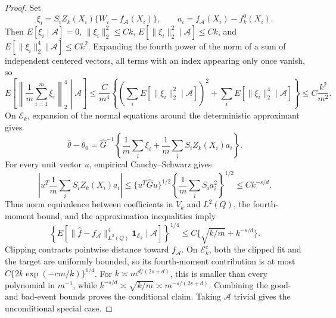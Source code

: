 \documentclass{article}
\begin{document}
\begin{proof}
Set
\[
\xi_i=S_iZ_k(X_i)\{W_i-f_{\mathcal A}(X_i)\},\qquad
a_i=f_{\mathcal A}(X_i)-f_k^0(X_i).
\]
Then \(E[\xi_i\mid\mathcal A]=0\), \(\|\xi_i\|_2^2\le Ck\),
\(E[\|\xi_i\|_2^2\mid\mathcal A]\le Ck\), and
\(E[\|\xi_i\|_2^4\mid\mathcal A]\le Ck^2\).  Expanding the fourth power of the norm of a sum of independent centered vectors, all terms with an index appearing only once vanish, so
\[
E\!\left[\left\|\frac1m\sum_{i=1}^m\xi_i\right\|_2^4\middle|\mathcal A\right]
\le \frac{C}{m^4}\left\{
\left(\sum_iE[\|\xi_i\|_2^2\mid\mathcal A]\right)^2+
\sum_iE[\|\xi_i\|_2^4\mid\mathcal A]\right\}
\le C\frac{k^2}{m^2}.
\]
On \(\mathcal E_k\), expansion of the normal equations around the deterministic approximant gives
\[
\widehat\theta-\theta_0
=\widehat G^{-1}\left\{\frac1m\sum_i\xi_i+
\frac1m\sum_iS_iZ_k(X_i)a_i\right\}.
\]
For every unit vector \(u\), empirical Cauchy--Schwarz gives
\[
\left|u^T\frac1m\sum_iS_iZ_k(X_i)a_i\right|
\le\{u^T\widehat Gu\}^{1/2}
\left\{\frac1m\sum_iS_ia_i^2\right\}^{1/2}
\le Ck^{-s/d}.
\]
Thus norm equivalence between coefficients in \(V_k\) and \(L^2(Q)\), the fourth-moment bound, and the approximation inequalities imply
\[
\left\{E\!\left[\|\widehat f-f_{\mathcal A}\|_{L^2(Q)}^4
\mathbf1_{\mathcal E_k}\mid\mathcal A\right]\right\}^{1/4}
\le C\{\sqrt{k/m}+k^{-s/d}\}.
\]
Clipping contracts pointwise distance toward \(f_{\mathcal A}\).  On \(\mathcal E_k^c\), both the clipped fit and the target are uniformly bounded, so its fourth-moment contribution is at most
\(C\{2k\exp(-cm/k)\}^{1/4}\).  For
\(k\asymp m^{d/(2s+d)}\), this is smaller than every polynomial in \(m^{-1}\), while
\(k^{-s/d}\asymp\sqrt{k/m}\asymp m^{-s/(2s+d)}\).  Combining the good- and bad-event bounds proves the conditional claim.  Taking \(\mathcal A\) trivial gives the unconditional special case.
\end{proof}
\end{document}
